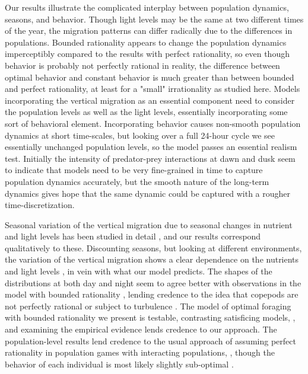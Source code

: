 Our results illustrate the complicated interplay between population dynamics, seasons, and behavior. Though light levels may be the same at two different times of the year, the migration patterns can differ radically due to the differences in populations. Bounded rationality appears to change the population dynamics imperceptibly compared to the results with perfect rationality, so even though behavior is probably not perfectly rational in reality, the difference between optimal behavior and constant behavior is much greater than between bounded and perfect rationality, at least for a "small" irrationality as studied here. Models incorporating the vertical migration as an essential component need to consider the population levels as well as the light levels, essentially incorporating some sort of behavioral element. Incorporating behavior causes non-smooth population dynamics at short time-scales, but looking over a full 24-hour cycle we see essentially unchanged population levels, so the model passes an essential realism test. Initially the intensity of predator-prey interactions at dawn and dusk seem to indicate that models need to be very fine-grained in time to capture population dynamics accurately, but the smooth nature of the long-term dynamics gives hope that the same dynamic could be captured with a rougher time-discretization.


Seasonal variation of the vertical migration due to seasonal changes in nutrient and light levels has been studied in detail \citep{wang2014seasonal, beaugrand2001geographical, colebrook1979continuous}, and our results correspond qualitatively to these. Discounting seasons, but looking at different environments, the variation of the vertical migration shows a clear dependence on the nutrients and light levels \citep{klevjer2016large}, in vein with what our model predicts. The shapes of the distributions at both day and night seem to agree better with observations in the model with bounded rationality \citep{hay1991zooplankton}, lending credence to the idea that copepods are not perfectly rational or subject to turbulence \citep{visser2001observations}. The model of optimal foraging with bounded rationality we present is testable, contrasting satisficing models,
\citep{nonacs1993satisficing}, and examining the empirical evidence lends credence to our approach. The population-level results lend credence to the usual approach of assuming perfect
rationality in population games with interacting populations, \citep{kvrivan2008ideal}, though the behavior of each individual is most likely slightly sub-optimal
\citep{hurly1999context}.

